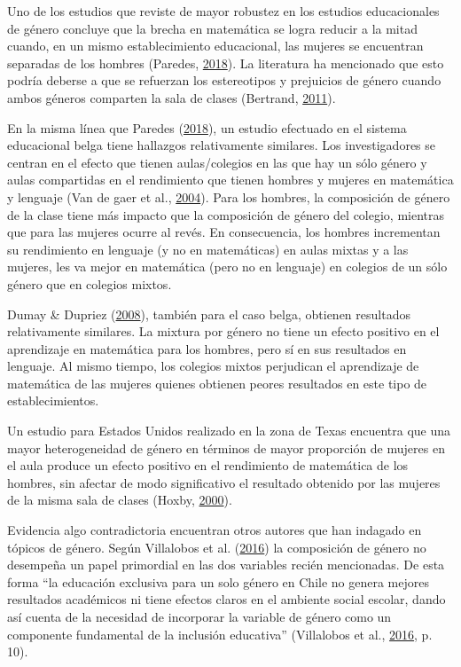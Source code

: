 \documentclass[
]{article}
\begin{document}
Uno de los estudios que reviste de mayor robustez en los estudios
educacionales de género concluye que la brecha en matemática se logra
reducir a la mitad cuando, en un mismo establecimiento educacional, las
mujeres se encuentran separadas de los hombres (Paredes,
\protect\hyperlink{ref-paredes_mixed_2018}{2018}). La literatura ha
mencionado que esto podría deberse a que se refuerzan los estereotipos y
prejuicios de género cuando ambos géneros comparten la sala de clases
(Bertrand, \protect\hyperlink{ref-bertrand_new_2011}{2011}).

En la misma línea que Paredes
(\protect\hyperlink{ref-paredes_mixed_2018}{2018}), un estudio efectuado
en el sistema educacional belga tiene hallazgos relativamente similares.
Los investigadores se centran en el efecto que tienen aulas/colegios en
las que hay un sólo género y aulas compartidas en el rendimiento que
tienen hombres y mujeres en matemática y lenguaje (Van de gaer et al.,
\protect\hyperlink{ref-vandegaer_effects_2004}{2004}). Para los hombres,
la composición de género de la clase tiene más impacto que la
composición de género del colegio, mientras que para las mujeres ocurre
al revés. En consecuencia, los hombres incrementan su rendimiento en
lenguaje (y no en matemáticas) en aulas mixtas y a las mujeres, les va
mejor en matemática (pero no en lenguaje) en colegios de un sólo género
que en colegios mixtos.

Dumay \& Dupriez (\protect\hyperlink{ref-dumay_does_2008}{2008}),
también para el caso belga, obtienen resultados relativamente similares.
La mixtura por género no tiene un efecto positivo en el aprendizaje en
matemática para los hombres, pero sí en sus resultados en lenguaje. Al
mismo tiempo, los colegios mixtos perjudican el aprendizaje de
matemática de las mujeres quienes obtienen peores resultados en este
tipo de establecimientos.

Un estudio para Estados Unidos realizado en la zona de Texas encuentra
que una mayor heterogeneidad de género en términos de mayor proporción
de mujeres en el aula produce un efecto positivo en el rendimiento de
matemática de los hombres, sin afectar de modo significativo el
resultado obtenido por las mujeres de la misma sala de clases (Hoxby,
\protect\hyperlink{ref-hoxby_peer_2000}{2000}).

Evidencia algo contradictoria encuentran otros autores que han indagado
en tópicos de género. Según Villalobos et al.
(\protect\hyperlink{ref-villalobos_composicion_2016}{2016}) la
composición de género no desempeña un papel primordial en las dos
variables recién mencionadas. De esta forma ``la educación exclusiva
para un solo género en Chile no genera mejores resultados académicos ni
tiene efectos claros en el ambiente social escolar, dando así cuenta de
la necesidad de incorporar la variable de género como un componente
fundamental de la inclusión educativa'' (Villalobos et al.,
\protect\hyperlink{ref-villalobos_composicion_2016}{2016}, p. 10).
\end{document}
